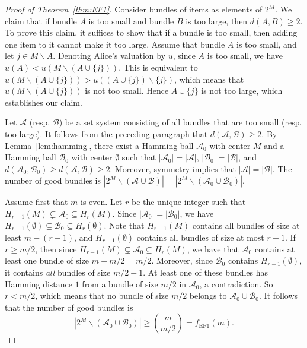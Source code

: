 \documentclass[11pt]{scrartcl}
\theoremstyle{definition}
\begin{document}
\begin{proof}[Proof of Theorem~\ref{thm:EF1}]
Consider bundles of items as elements of $2^M$.
We claim that if bundle $A$ is too small and bundle $B$ is too large, then $d(A,B)\geq 2$.
To prove this claim, it suffices to show that if a bundle is too small, then adding one item to it cannot make it too large.
Assume that bundle $A$ is too small, and let $j\in M\backslash A$.
Denoting Alice's valuation by $u$, since $A$ is too small, we have $u(A)<u(M\backslash(A\cup\{j\}))$.
This is equivalent to $u(M\backslash(A\cup\{j\})) > u((A\cup\{j\})\backslash\{j\})$, which means that $u(M\backslash(A\cup\{j\}))$ is not too small.
Hence $A\cup\{j\}$ is not too large, which establishes our claim.

Let $\mathcal{A}$ (resp. $\mathcal{B}$) be a set system consisting of all bundles that are too small  (resp. too large).
It follows from the preceding paragraph that $d(\mathcal{A},\mathcal{B})\geq 2$.
By Lemma~\ref{lem:hamming}, there exist a Hamming ball $\mathcal{A}_0$ with center $M$ and a Hamming ball $\mathcal{B}_0$ with center $\emptyset$ such that $|\mathcal{A}_0|=|\mathcal{A}|$, $|\mathcal{B}_0|=|\mathcal{B}|$, and $d(\mathcal{A}_0,\mathcal{B}_0)\geq d(\mathcal{A},\mathcal{B})\geq 2$.
Moreover, symmetry implies that $|\mathcal{A}|=|\mathcal{B}|$.
The number of good bundles is $
|2^M\backslash(\mathcal{A}\cup\mathcal{B})|
=
|2^M\backslash(\mathcal{A}_0\cup\mathcal{B}_0)|$.

Assume first that $m$ is even. 
Let $r$ be the unique integer such that $H_{r-1}(M)\subsetneq\mathcal{A}_0\subseteq H_r(M)$.
Since $|\mathcal{A}_0|=|\mathcal{B}_0|$, we have $H_{r-1}(\emptyset)\subsetneq\mathcal{B}_0\subseteq H_r(\emptyset)$.
Note that $H_{r-1}(M)$ contains all bundles of size at least $m-(r-1)$, and $H_{r-1}(\emptyset)$ contains all bundles of size at most $r-1$.
If $r\geq m/2$, then since $H_{r-1}(M)\subsetneq\mathcal{A}_0\subseteq H_r(M)$, we have that $\mathcal{A}_0$ contains at least one bundle of size $m-m/2 = m/2$.
Moreover, since $\mathcal{B}_0$ contains $H_{r-1}(\emptyset)$, it contains \emph{all} bundles of size $m/2-1$.
At least one of these bundles has Hamming distance $1$ from a bundle of size $m/2$ in $\mathcal{A}_0$, a contradiction.
So $r<m/2$, which means that no bundle of size $m/2$ belongs to $\mathcal{A}_0\cup\mathcal{B}_0$.
It follows that the number of good bundles is
$$
|2^M\backslash(\mathcal{A}_0\cup\mathcal{B}_0)|
\geq
\binom{m}{m/2} = f_{\text{EF1}}(m).
$$



\end{proof}
\end{document}
